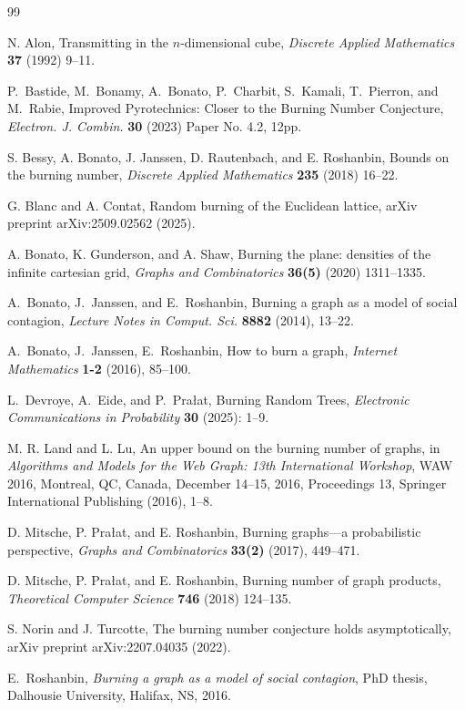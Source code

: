 \documentclass[12pt]{article}
\theoremstyle{remark}
\begin{document}
\begin{thebibliography}{99}

 N. Alon, Transmitting in the $n$-dimensional cube, \emph{Discrete Applied Mathematics} \textbf{37} (1992) 9--11.

 P.~Bastide, M.~Bonamy, A.~Bonato, P.~Charbit, S.~Kamali, T.~Pierron, and M.~Rabie, Improved Pyrotechnics: Closer to the Burning Number Conjecture, \emph{Electron. J. Combin.} \textbf{30} (2023) Paper No. 4.2, 12pp.

 S. Bessy, A. Bonato, J. Janssen, D. Rautenbach, and E. Roshanbin, Bounds on the burning number, \emph{Discrete Applied Mathematics} \textbf{235} (2018) 16--22.

 G. Blanc and A. Contat, Random burning of the Euclidean lattice, arXiv preprint arXiv:2509.02562 (2025).

 A. Bonato, K. Gunderson, and A. Shaw, Burning the plane: densities of the infinite cartesian grid, \emph{Graphs and Combinatorics} \textbf{36(5)} (2020) 1311--1335.

 A.~Bonato, J.~Janssen, and E.~Roshanbin, Burning a graph as a model of social contagion, \emph{Lecture Notes in Comput. Sci.} \textbf{8882} (2014), 13--22.

 A.~Bonato, J.~Janssen, E.~Roshanbin, How to burn a graph, \emph{Internet Mathematics} \textbf{1-2} (2016), 85--100.

 L.~Devroye, A.~Eide, and P.~Pra\l{}at, Burning Random Trees, \emph{Electronic Communications in Probability} \textbf{30} (2025): 1--9.

 M. R. Land and L. Lu, An upper bound on the burning number of graphs, in \emph{Algorithms and Models for the Web Graph: 13th International Workshop}, WAW 2016, Montreal, QC, Canada, December 14–15, 2016, Proceedings 13, Springer International Publishing (2016), 1--8.

 D. Mitsche, P. Pra\l{}at, and E. Roshanbin, Burning graphs---a probabilistic perspective, \emph{Graphs and Combinatorics} \textbf{33(2)} (2017), 449--471.

 D. Mitsche, P. Pra\l{}at, and E. Roshanbin, Burning number of graph products, \emph{Theoretical Computer Science} \textbf{746} (2018) 124--135.

 S. Norin and J. Turcotte, The burning number conjecture holds asymptotically, arXiv preprint arXiv:2207.04035 (2022).

E.~Roshanbin, {\em Burning a graph as a model of social contagion}, PhD thesis, Dalhousie University, Halifax, NS, 2016.
\end{thebibliography}
\end{document}
